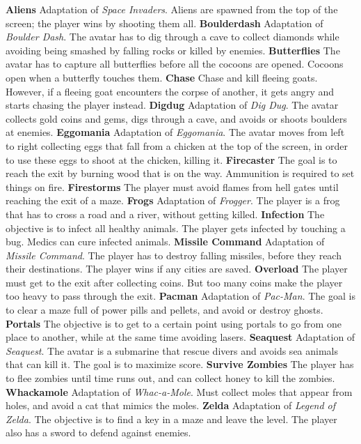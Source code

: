 \documentclass{llncs}
\begin{document}
\textbf{Aliens} Adaptation of \emph{Space Invaders}. Aliens are spawned from the top of the screen; the player wins by shooting them all.
\textbf{Boulderdash} Adaptation of \emph{Boulder Dash}. The avatar has to dig through a cave to collect diamonds while avoiding being smashed by falling rocks or killed by enemies.
\textbf{Butterflies} The avatar has to capture all butterflies before all the cocoons are opened. Cocoons open when a butterfly touches them.
\textbf{Chase} Chase and kill fleeing goats. However, if a fleeing goat encounters the corpse of another, it gets angry and starts chasing the player instead.
\textbf{Digdug} Adaptation of \emph{Dig Dug}. The avatar collects gold coins and gems, digs through a cave, and avoids or shoots boulders at enemies.
\textbf{Eggomania} Adaptation of \emph{Eggomania}. The avatar moves from left to right collecting eggs that fall from a chicken at the top of the screen, in order to use these eggs to shoot at the chicken, killing it.
\textbf{Firecaster} The goal is to reach the exit by burning wood that is on the way. Ammunition is required to set things on fire.
\textbf{Firestorms} The player must avoid flames from hell gates until reaching the exit of a maze.
\textbf{Frogs} Adaptation of \emph{Frogger}. The player is a frog that has to cross a road and a river, without getting killed.
\textbf{Infection} The objective is to infect all healthy animals. The player gets infected by touching a bug. Medics can cure infected animals.
\textbf{Missile Command} Adaptation of \emph{Missile Command}. The player has to destroy falling missiles, before they reach their destinations. The player wins if any cities are saved.
\textbf{Overload} The player must get to the exit after collecting coins. But too many coins make the player too heavy to pass through the exit.
\textbf{Pacman} Adaptation of \emph{Pac-Man}. The goal is to clear a maze full of power pills and pellets, and avoid or destroy ghosts.
\textbf{Portals} The objective is to get to a certain point using portals to go from one place to another, while at the same time avoiding lasers.
\textbf{Seaquest} Adaptation of \emph{Seaquest}. The avatar is a submarine that rescue divers and avoids sea animals that can kill it. The goal is to maximize score.
\textbf{Survive Zombies} The player has to flee zombies until time runs out, and can collect honey to kill the zombies.
\textbf{Whackamole} Adaptation of \emph{Whac-a-Mole}. Must collect moles that appear from holes, and avoid a cat that mimics the moles.
\textbf{Zelda} Adaptation of \emph{Legend of Zelda}. The objective is to find a key in a maze and leave the level. The player also has a sword to defend against enemies. \\
\end{document}
